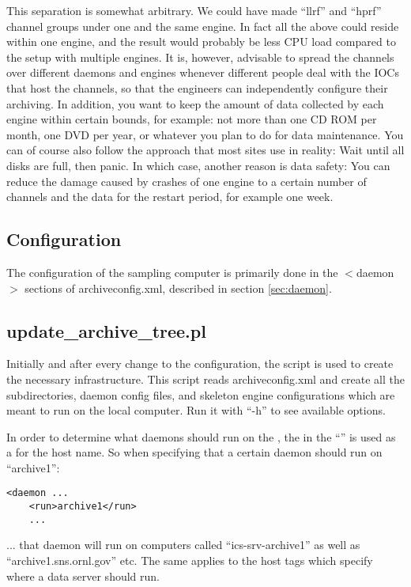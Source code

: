 This separation is somewhat arbitrary. We could have made ``llrf'' and
``hprf'' channel groups under one and the same engine. In fact all the
above could reside within one engine, and the result would probably be
less CPU load compared to the setup with multiple engines.  It is,
however, advisable to spread the channels over different daemons and
engines whenever different people deal with the IOCs that host the
channels, so that the engineers can independently configure their
archiving.  In addition, you want to keep the amount of data collected
by each engine within certain bounds, for example: not more than one
CD ROM per month, one DVD per year, or whatever you plan to do for
data maintenance. You can of course also follow the approach that most
sites use in reality: Wait until all disks are full, then panic.
In which case, another reason is data safety: You can reduce the
damage caused by crashes of one engine to a certain number of channels
and the data for the restart period, for example one week.

\subsection{Configuration}
The configuration of the sampling computer is primarily done
in the $<$daemon$>$ sections of archiveconfig.xml, described in
section \ref{sec:daemon}.

\subsection{update\_archive\_tree.pl}
Initially and after every change to the configuration,
the  script is used to create the necessary
infrastructure.
This script reads archiveconfig.xml and create all the subdirectories,
daemon config files, and skeleton engine configurations which are
meant to run on the local computer.
Run it with ``-h'' to see available options.

\NOTE In order to determine what daemons should run on the
,
the  in the ``'' is used as a
 for the host name.
So when specifying that a certain daemon should run on ``archive1'':
\begin{lstlisting}[keywordstyle=\sffamily]
 <daemon ...
    <run>archive1</run>
    ...
\end{lstlisting}
... that daemon will run on computers called ``ics-srv-archive1'' as well
as ``archive1.sns.ornl.gov'' etc.
The same applies to the host tags which specify where a
data server should run.

